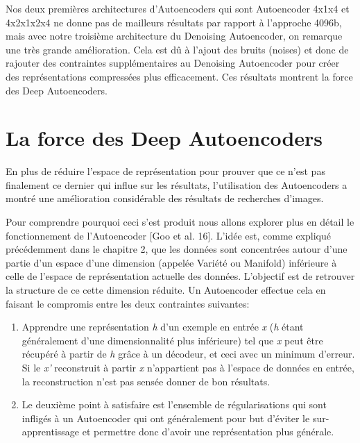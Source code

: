 	Nos deux premières architectures d'Autoencoders qui sont Autoencoder 4x1x4 et 4x2x1x2x4 ne donne pas de mailleurs résultats par rapport à l'approche 4096b, mais avec notre troisième architecture du Denoising Autoencoder, on remarque une très grande amélioration. Cela est dû à l'ajout des bruits (noises) et donc de rajouter des contraintes supplémentaires au Denoising Autoencoder pour créer des représentations compressées plus efficacement. Ces résultats montrent la force des Deep Autoencoders.


\section{La force des Deep Autoencoders}
	En plus de réduire l'espace de représentation pour prouver que ce n'est pas finalement ce dernier qui influe sur les résultats, l'utilisation des Autoencoders a montré une amélioration considérable des résultats de recherches d'images.

	Pour comprendre pourquoi ceci s'est produit nous allons explorer plus en détail le fonctionnement de l'Autoencoder [Goo et al. 16]. L’idée est, comme expliqué précédemment dans le chapitre 2, que les données sont concentrées autour d'une partie d'un espace d'une dimension (appelée Variété ou Manifold) inférieure à celle de l'espace de représentation actuelle des données. L'objectif est de retrouver la structure de ce cette dimension réduite. Un Autoencoder effectue cela en faisant le compromis entre les deux contraintes suivantes:

\begin{enumerate}[i]
\item Apprendre une représentation \textit{h} d'un exemple en entrée \textit{x} (\textit{h} étant généralement d'une dimensionnalité plus inférieure) tel que \textit{x} peut être récupéré à partir de \textit{h} grâce à un décodeur, et ceci avec un minimum d'erreur. Si le \textit{x'} reconstruit à partir \textit{x} n'appartient pas à l'espace de données en entrée, la reconstruction n'est pas sensée donner de bon résultats.

\item Le deuxième point à satisfaire est l'ensemble de régularisations qui sont infligés à un Autoencoder qui ont généralement pour but d’éviter le sur-apprentissage et permettre donc d'avoir une représentation plus générale.

\end{enumerate}


